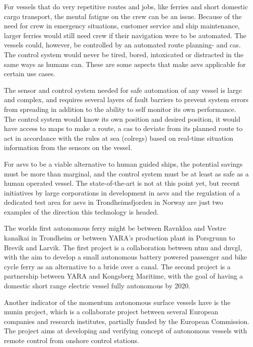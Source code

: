 For vessels that do very repetitive routes and jobs, like ferries and short domestic cargo transport, the mental fatigue on the crew can be an issue. Because of the need for crew in emergency situations, customer service and ship maintenance, larger ferries would still need crew if their navigation were to be automated. The vessels could, however, be controlled by an automated route planning- and \gls{cas}. The control system would never be tired, bored, intoxicated or distracted in the same ways as humans can. These are some aspects that make \glspl{asv} applicable for certain use cases.

The sensor and control system needed for safe automation of any vessel is large and complex, and requires several layers of fault barriers to prevent system errors from spreading in addition to the ability to self monitor its own performance. The control system would know its own position and desired position, it would have access to maps to make a route, a \gls{cas} to deviate from its planned route to act in accordance with the rules at sea (\gls{colregs}) based on real-time situation information from the sensors on the vessel.

For \glspl{asv} to be a viable alternative to human guided ships, the potential savings must be more than marginal, and the control system must be at least as safe as a human operated vessel. The state-of-the-art is not at this point yet, but recent initiatives by large corporations in development in \glspl{asv} and the regulation of a dedicated test area for \glspl{asv} in Trondheimsfjorden in Norway are just two examples of the direction this technology is headed.

The worlds first autonomous ferry might be between Ravnkloa and Vestre kanalkai in Trondheim or between YARA's production plant in Porsgrunn to Brevik and Larvik. The first project is a collaboration between \gls{ntnu} and \gls{dnvgl}, with the aim to develop a small autonomous battery powered passenger and bike cycle ferry as an alternative to a bride over a canal. The second project is a partnership between YARA and Kongsberg Maritime, with the goal of having a domestic short range electric vessel fully autonomous by 2020.

Another indicator of the momentum autonomous surface vessels have is the \gls{munin} project, which is a collaborate project between several European companies and research institutes, partially funded by the European Commission. The project aims at developing and verifying concept of autonomous vessels with remote control from onshore control stations.

